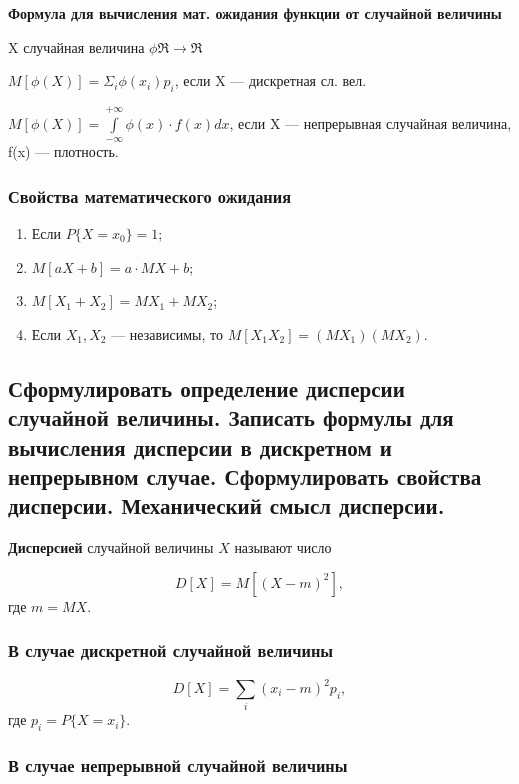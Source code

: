 \textbf{Формула для вычисления мат. ожидания функции от случайной величины}

X случайная величина $\phi \Re \rightarrow \Re$ 

$M[\phi(X)] = \Sigma_i\phi(x_i)p_i$, если X --- дискретная сл. вел.

$M[\phi(X)] = \int\limits_{-\infty}^{+\infty} \phi(x) \cdot f(x)dx$, если X --- непрерывная случайная величина, f(x) --- плотность.

\subsubsection*{Свойства математического ожидания}

\begin{enumerate}
	\item Если $P\{X = x_{0}\} = 1$;
	\item $M[aX + b] = a \cdot MX + b$;
	\item $M[X_{1} + X_{2}] = MX_{1} + MX_{2}$;
	\item Если $X_{1}, X_{2}$ --- независимы, то $M[X_{1}X_{2}] = (MX_{1})(MX_{2})$.
\end{enumerate}

\subsection{Сформулировать определение дисперсии случайной величины. Записать формулы для вычисления дисперсии в дискретном и непрерывном случае. Сформулировать свойства дисперсии. Механический смысл дисперсии.}

\textbf{Дисперсией} случайной величины $X$ называют число

\begin{equation}
	D[X] = M[(X - m)^{2}],
\end{equation}
где $m = MX$.

\subsubsection*{В случае дискретной случайной величины}

\begin{equation}
	D[X] = \sum_{i}(x_{i} - m)^{2}p_{i},
\end{equation}
где $p_{i} = P\{X = x_{i}\}$.

\subsubsection*{В случае непрерывной случайной величины}

